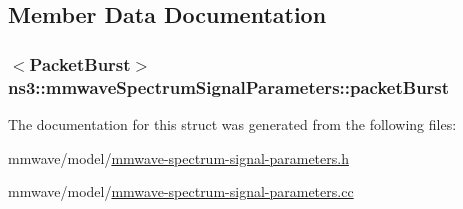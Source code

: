 \subsection{Member Data Documentation}
\subsubsection[{\texorpdfstring{packet\+Burst}{packetBurst}}]{$<${\bf Packet\+Burst}$>$ ns3\+::mmwave\+Spectrum\+Signal\+Parameters\+::packet\+Burst}\hypertarget{structns3_1_1mmwaveSpectrumSignalParameters_a392695892424ef1623e8c5cdd5b7b455}{}\label{structns3_1_1mmwaveSpectrumSignalParameters_a392695892424ef1623e8c5cdd5b7b455}


The documentation for this struct was generated from the following files\+:\begin{DoxyCompactItemize}
\item 
mmwave/model/\hyperlink{mmwave-spectrum-signal-parameters_8h}{mmwave-\/spectrum-\/signal-\/parameters.\+h}\item 
mmwave/model/\hyperlink{mmwave-spectrum-signal-parameters_8cc}{mmwave-\/spectrum-\/signal-\/parameters.\+cc}\end{DoxyCompactItemize}
